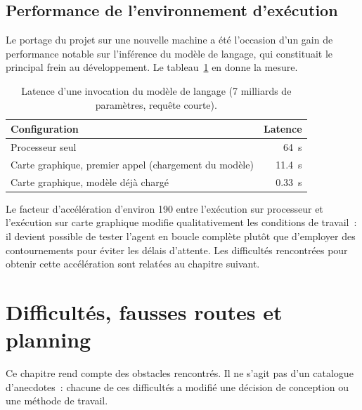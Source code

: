 \documentclass[12pt,a4paper,french]{report}
\begin{document}
\section{Performance de l'environnement d'exécution}
\label{sec:latence}

Le portage du projet sur une nouvelle machine a été l'occasion d'un gain de
performance notable sur l'inférence du modèle de langage, qui constituait le
principal frein au développement. Le tableau~\ref{tab:latence} en donne la
mesure.

\begin{table}[htbp]
\centering
\caption[Latence d'une invocation du modèle]{Latence d'une invocation du modèle de langage
(\num{7} milliards de paramètres, requête courte).}
\label{tab:latence}
\begin{tabularx}{0.85\textwidth}{@{}Xr@{}}
\toprule
\textbf{Configuration} & \textbf{Latence}\\
\midrule
Processeur seul & \SI{64}{\second}\\
Carte graphique, premier appel (chargement du modèle) & \SI{11.4}{\second}\\
Carte graphique, modèle déjà chargé & \SI{0.33}{\second}\\
\bottomrule
\end{tabularx}
\end{table}

Le facteur d'accélération d'environ \num{190} entre l'exécution sur processeur
et l'exécution sur carte graphique modifie qualitativement les conditions de
travail~: il devient possible de tester l'agent en boucle complète plutôt que
d'employer des contournements pour éviter les délais d'attente. Les difficultés
rencontrées pour obtenir cette accélération sont relatées au chapitre suivant.

\clearpage

\chapter{Difficultés, fausses routes et planning}

Ce chapitre rend compte des obstacles rencontrés. Il ne s'agit pas d'un
catalogue d'anecdotes~: chacune de ces difficultés a modifié une décision de
conception ou une méthode de travail.
\end{document}
